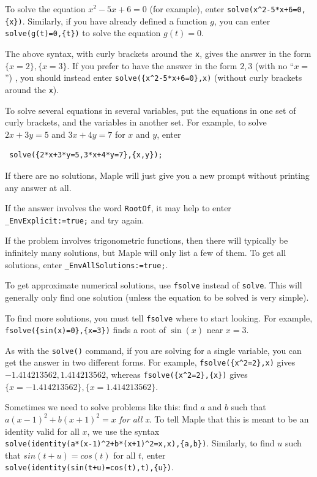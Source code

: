 \documentclass{amsart}
\begin{document}
\begin{secenum}
%
 \item\label{solve} To solve the equation $x^2-5x+6=0$ (for example), enter
  \verb~solve(x^2-5*x+6=0,{x})~.  Similarly, if you have
  already defined a function $g$, you can enter
  \verb~solve(g(t)=0,{t})~ to solve the equation $g(t)=0$. 
%
  \item\label{roots}
   The above syntax, with curly brackets around
   the \verb~x~, gives the answer in the form
   $\{x=2\},\{x=3\}$.  If you prefer to have the answer in
   the form $2,3$ (with no ``$x=$'') , you should instead enter
   \verb~solve({x^2-5*x+6=0},x)~ (without curly brackets
   around the \verb~x~). 
%
 \item\label{multisolve} To solve several equations in several variables, put the
  equations in one set of curly brackets, and the variables in another
  set.  For example, to solve $2x+3y=5$ and $3x+4y=7$ for $x$ and $y$,
  enter 
\begin{verbatim}
 solve({2*x+3*y=5,3*x+4*y=7},{x,y});
\end{verbatim}
%
 \item\label{nosols} If there are no solutions, Maple will just give you a new
  prompt without printing any answer at all. 
%
 \item\label{envexplicit} If the answer involves the word
  \verb~RootOf~, it may help to enter
  \verb~_EnvExplicit:=true;~ and try again.  
%
 \item\label{allsolutions} If the problem involves trigonometric
  functions, then there will typically be infinitely many
  solutions, but Maple will only list a few of them.  To get
  all solutions, enter \verb~_EnvAllSolutions:=true;~. 
%
 \item\label{fsolve} To get approximate numerical solutions, use \verb~fsolve~
  instead of \verb~solve~.  This will generally only find one solution
  (unless the equation to be solved is very simple).  
%
 \item\label{fsolveinitial}
  To find more solutions, you must tell \verb~fsolve~ where
  to start looking.  For example,
  \verb~fsolve({sin(x)=0},{x=3})~ finds a root of $\sin(x)$
  near $x=3$.  
%
 \item\label{froots} As with the \verb~solve()~ command, if you are
  solving for a single variable, you can get the answer in
  two different forms.  For example, \verb~fsolve({x^2=2},x)~
  gives $-1.414213562, 1.414213562$, whereas
  \verb~fsolve({x^2=2},{x})~ gives $\{x=-1.414213562\},
  \{x=1.414213562\}$. 
% 
 \item\label{identity} Sometimes we need to solve problems like
  this: find $a$ and $b$ such that $a(x-1)^2+b(x+1)^2=x$
  \emph{for all x}.  To tell Maple that this is meant to be
  an identity valid for all $x$, we use the syntax \\
  \verb~solve(identity(a*(x-1)^2+b*(x+1)^2=x,x),{a,b})~. 
  Similarly, to find $u$ such that $sin(t+u)=cos(t)$ for all
  $t$, enter
  \verb~solve(identity(sin(t+u)=cos(t),t),{u})~. 
\end{secenum}
\end{document}
